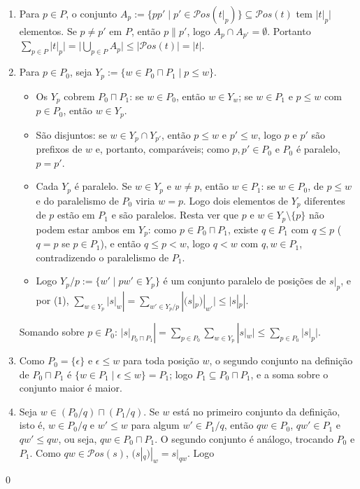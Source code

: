 \documentclass[a4paper]{article}
\newcommand{\pos}[1]{\mathcal{P}os(#1)}
\newcommand{\termpos}[1]{|_{#1}}
\theoremstyle{definition}
\theoremstyle{plain}
\renewenvironment{proof}{{\bfseries \noindent Demonstração:}}{\qed}
\begin{document}
	\begin{proof}
		\begin{enumerate}
			\item Para \(p \in P\), o conjunto \(A_p := \{pp' \mid p' \in \pos{t\termpos{p}}\} \subseteq \pos{t}\) tem \(|t\termpos{p}|\) elementos. Se \(p \neq p'\) em \(P\), então \(p \parallel p'\), logo \(A_p \cap A_{p'} = \emptyset\). Portanto \(\sum_{p \in P} |t\termpos{p}| = |\bigcup_{p \in P} A_p| \leq |\pos{t}| = |t|\).
			\item Para \(p \in P_0\), seja \(Y_p := \{w \in P_0 \sqcap P_1 \mid p \leq w\}\).
			\begin{itemize}
				\item Os \(Y_p\) cobrem \(P_0 \sqcap P_1\): se \(w \in P_0\), então \(w \in Y_w\); se \(w \in P_1\) e \(p \leq w\) com \(p \in P_0\), então \(w \in Y_p\).
				\item São disjuntos: se \(w \in Y_p \cap Y_{p'}\), então \(p \leq w\) e \(p' \leq w\), logo \(p\) e \(p'\) são prefixos de \(w\) e, portanto, comparáveis; como \(p, p' \in P_0\) e \(P_0\) é paralelo, \(p = p'\).
				\item Cada \(Y_p\) é paralelo. Se \(w \in Y_p\) e \(w \neq p\), então \(w \in P_1\): se \(w \in P_0\), de \(p \leq w\) e do paralelismo de \(P_0\) viria \(w = p\). Logo dois elementos de \(Y_p\) diferentes de \(p\) estão em \(P_1\) e são paralelos. Resta ver que \(p\) e \(w \in Y_p \setminus \{p\}\) não podem estar ambos em \(Y_p\): como \(p \in P_0 \sqcap P_1\), existe \(q \in P_1\) com \(q \leq p\) (\(q = p\) se \(p \in P_1\)), e então \(q \leq p < w\), logo \(q < w\) com \(q, w \in P_1\), contradizendo o paralelismo de \(P_1\).
				\item Logo \(Y_p/p := \{w' \mid pw' \in Y_p\}\) é um conjunto paralelo de posições de \(s\termpos{p}\), e por (1),
					\(\sum_{w \in Y_p} |s\termpos{w}| = \sum_{w' \in Y_p/p} |(s\termpos{p})\termpos{w'}| \leq |s\termpos{p}|\).
			\end{itemize}
			Somando sobre \(p \in P_0\): \(|s|_{P_0 \sqcap P_1}| = \sum_{p \in P_0} \sum_{w \in Y_p} |s\termpos{w}| \leq \sum_{p \in P_0} |s\termpos{p}|\).
			\item Como \(P_0 = \{\epsilon\}\) e \(\epsilon \leq w\) para toda posição \(w\), o segundo conjunto na definição de \(P_0 \sqcap P_1\) é \(\{w \in P_1 \mid \epsilon \leq w\} = P_1\); logo \(P_1 \subseteq P_0 \sqcap P_1\), e a soma sobre o conjunto maior é maior.
			\item Seja \(w \in (P_0/q) \sqcap (P_1/q)\). Se \(w\) está no primeiro conjunto da definição, isto é, \(w \in P_0/q\) e \(w' \leq w\) para algum \(w' \in P_1/q\), então \(qw \in P_0\), \(qw' \in P_1\) e \(qw' \leq qw\), ou seja, \(qw \in P_0 \sqcap P_1\). O segundo conjunto é análogo, trocando \(P_0\) e \(P_1\). Como \(qw \in \pos{s}\), \((s\termpos{q})\termpos{w} = s\termpos{qw}\). Logo

\end{enumerate}
\end{proof}
\end{document}
